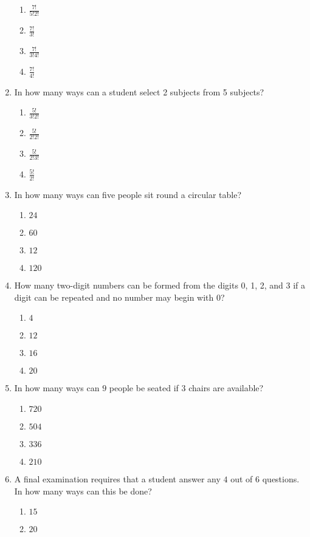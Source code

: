 \begin{multicols}{2}
\begin{enumerate}[label={\arabic*.}]
\begin{enumerate}[label={\Alph*.}]
	\item \(\tfrac{7!}{5!2!}\)
	\item \(\tfrac{7!}{3!}\)
	\item \(\tfrac{7!}{3!4!}\)
	\item \(\tfrac{7!}{4!}\)
	\end{enumerate}
\item In how many ways can a student select 2 subjects from 5 subjects?
	\begin{enumerate}[label={\Alph*.}]
	\item \(\tfrac{5!}{3!2!}\)
	\item \(\tfrac{5!}{2!2!}\)
	\item \(\tfrac{5!}{2!3!}\)
	\item \(\tfrac{5!}{2!}\)
	\end{enumerate}
\item In how many ways can five people sit round a circular table?
	\begin{enumerate}[label={\Alph*.}]
	\item \(24\)
	\item \(60\)
	\item \(12\)
	\item \(120\)
	\end{enumerate}
\item How many two-digit numbers can be formed from the digits 0, 1, 2, and 3 if a digit can be repeated and no number may begin with 0?
	\begin{enumerate}[label={\Alph*.}]
	\item \(4\)
	\item \(12\)
	\item \(16\)
	\item \(20\)
	\end{enumerate}
\item In how many ways can \(9\) people be seated if \(3\) chairs are available?
	\begin{enumerate}[label={\Alph*.}]
	\item \(720\)
	\item \(504\)
	\item \(336\)
	\item \(210\)
	\end{enumerate}
\item A final examination requires that a student answer any \(4\) out of \(6\) questions. In how many ways can this be done?
	\begin{enumerate}[label={\Alph*.}]
	\item \(15\)
	\item \(20\)

\end{enumerate}
\end{enumerate}
\end{multicols}
